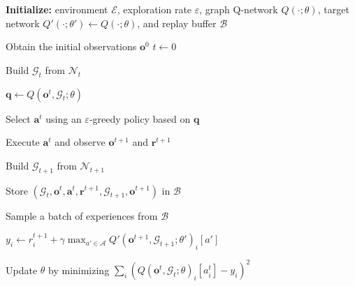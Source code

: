 \begin{algorithm}[H]
    \caption{Deep Graph Q-Learning (DGQL)}
    \label{alg:DQN}

    \begin{algorithmic}[1]
        \State \textbf{Initialize:}
            environment $\mathcal{E}$,
            exploration rate $\varepsilon$,
            graph Q-network $Q(\cdot;\theta)$,
            target network
            $Q'(\cdot;\theta') \gets Q(\cdot;\theta)$,
            and replay buffer $\mathcal{B}$

            \State Obtain the initial observations $\mathbf{o}^0$
            \State $t \gets 0$

                \State Build $\mathcal{G}_t$ from
                    $\mathcal{N}_t$
                    \hfill {}

                \State $\mathbf{q}
                    \gets Q(\mathbf{o}^t,\mathcal{G}_t;\theta)$
                    \hfill {}

                \State Select $\mathbf{a}^t$ using an
                    $\varepsilon$-greedy policy based on $\mathbf{q}$
                    \hfill {}

                \State Execute $\mathbf{a}^t$ and observe
                    $\mathbf{o}^{t+1}$ and $\mathbf{r}^{t+1}$

                \State Build $\mathcal{G}_{t+1}$ from
                    $\mathcal{N}_{t+1}$

                \State Store
                    $(\mathcal{G}_t,
                    \mathbf{o}^t,
                    \mathbf{a}^t,
                    \mathbf{r}^{t+1},
                    \mathcal{G}_{t+1},
                    \mathbf{o}^{t+1})$
                    in $\mathcal{B}$
                    \hfill {}

                \State Sample a batch of experiences from
                    $\mathcal{B}$
                    \hfill {}

                    \State $y_i \gets
                        r_i^{t+1}
                        + \gamma
                        \displaystyle\max_{a' \in \mathcal{A}}
                        Q'(\mathbf{o}^{t+1},
                           \mathcal{G}_{t+1};
                           \theta')_i[a']$
                \EndFor

                \State Update $\theta$ by minimizing
                    $\displaystyle
                    \sum_i
                    \left(
                        Q(\mathbf{o}^t,
                          \mathcal{G}_t;
                          \theta)_i[a_i^t]
                        - y_i
                    \right)^2$
                    \hfill {}


\end{algorithmic}
\end{algorithm}
